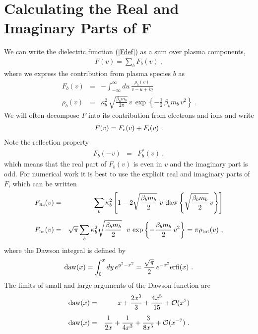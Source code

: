 \documentclass[preprint,12pt,eqsecnum,nofootinbib,amsmath,amssymb]{revtex4}
\newcommand{\smI}{{\rm\scriptscriptstyle I}}
\newcommand{\smRe}{{\rm\scriptscriptstyle Re}}
\newcommand{\smIm}{{\rm\scriptscriptstyle Im}}
\begin{document}
{{\section{Calculating the Real and Imaginary Parts of F}
\label{app:FrFi}

We can write the dielectric function (\ref{Fdef}) as a sum over plasma
components,
\begin{eqnarray}
  F(v)={\sum}_b F_b(v) \ ,
\end{eqnarray}
where we express the contribution from plasma species $b$ as
\begin{eqnarray}
  F_b(v) 
  &=& 
\label{Fbdef}
  -\int_{-\infty}^\infty du\, \frac{\rho_b(v)}{v - u + i\eta}
\\[5pt]
  \rho_b(v) 
  &=& 
  \kappa_b^2\,\sqrt{\frac{\beta_b m_b}{2\pi}}\, v\,
  \exp\!\left\{-\frac{1}{2}\,\beta_b m_b\, v^2\right\} \ .
\label{barrhob}
\end{eqnarray} 
We will often decompose $F$ into its contribution from
electrons and ions and write
\begin{eqnarray}
 F(v)=F_e(v) + F_\smI(v) \ .
\end{eqnarray}
Note the reflection property
\begin{eqnarray}
  F_b(-v) 
  &=& 
  F_b^*(v) \ ,
\label{Fbreflect}
\end{eqnarray}
which means that the real part of $F_b(v)$ is even in $v$ and the
imaginary part is odd. For numerical work it is best to use the
explicit real and imaginary parts of $F$, which can be written
\begin{eqnarray}
  F_\smRe(v)
  &=& 
  \sum_b \kappa_b^2 
  \left[1 - 2 \sqrt{\frac{\beta_b m_b}{2}} ~v~
  {\rm daw}\left\{\sqrt{\frac{\beta_b m_b}{2}}\,v 
  \right\} \right]
\label{Fru}
\\[5pt]
  F_\smIm(v)
  &=&
  \sqrt{\pi} \sum_b \kappa_b^2 
  \sqrt{\frac{\beta_b m_b}{2}}~~
  v\, \exp\left\{-\frac{\beta_b m_b}
  {2}\, v^2\right\} = \pi  \rho_{\rm tot}(v)  \ ,
\label{Fiu}
\end{eqnarray}
where the Dawson integral is defined by 
  \begin{eqnarray}
  {\rm daw}(x) = \int_0^x dy\, 
  e^{y^2 - x^2} = \frac{\sqrt{\pi}}{2}\, e^{-x^2}
  {\rm erfi}(x) \ .
  \end{eqnarray}
The limits of small and large arguments of the Dawson function
are
\begin{eqnarray}
  {\rm daw}(x) 
  &=& 
  x +\frac{2 x^3}{3} + \frac{4 x^5}{15} + {\cal O}(x^7) 
\label{dawA}
\\[5pt]
  {\rm daw}(x)
  &=&
  \frac{1}{2x} +\frac{1}{4 x^3} + \frac{3}{8x^5} + {\cal O}(x^{-7}) \ .
\label{dawB}
\end{eqnarray}

}}
\end{document}
